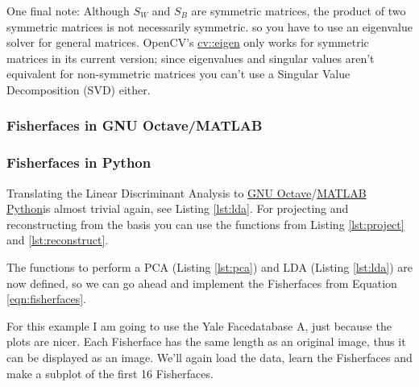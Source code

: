One final note: Although $S_{W}$ and $S_{B}$ are symmetric matrices, the product of two symmetric matrices is not necessarily symmetric. so you have to use an eigenvalue solver for general matrices. OpenCV's \href{http://opencv.willowgarage.com/documentation/cpp/operations_on_arrays.html#cv-eigen}{cv::eigen} only works for symmetric matrices in its current version; since eigenvalues and singular values aren't equivalent for non-symmetric matrices you can't use a Singular Value Decomposition (SVD) either.

\ifx\python\undefined 
	\subsubsection{Fisherfaces in GNU Octave/MATLAB}
\else
 \subsubsection{Fisherfaces in Python}
\fi

\label{ssection:example_fisherfaces}

Translating the Linear Discriminant Analysis to \ifx\python\undefined \href{http://www.gnu.org/software/octave/}{GNU Octave}/\href{http://www.mathworks.com}{MATLAB} \else \href{http://www.python.org}{Python}\fi is almost trivial again, see Listing \ref{lst:lda}. For projecting and reconstructing from the basis you can use the functions from Listing \ref{lst:project} and \ref{lst:reconstruct}.
\ifx\python\undefined
	
\else
		
\fi

The functions to perform a PCA (Listing \ref{lst:pca}) and LDA (Listing \ref{lst:lda}) are now defined, so we can go ahead and implement the Fisherfaces from Equation \ref{eqn:fisherfaces}. 

\ifx\python\undefined
	
\else
	
\fi

For this example I am going to use the Yale Facedatabase A, just because the plots are nicer. Each Fisherface has the same length as an original image, thus it can be displayed as an image. We'll again load the data, learn the Fisherfaces and make a subplot of the first 16 Fisherfaces.


